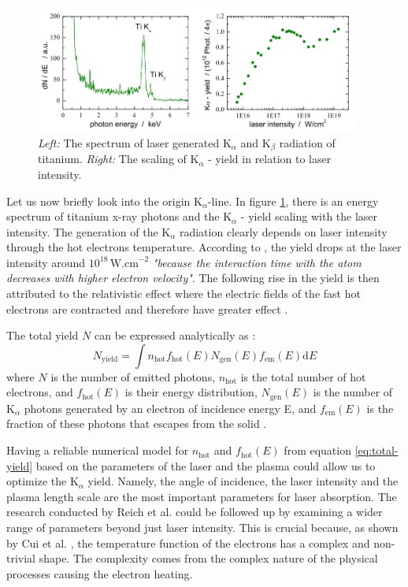 \begin{figure}[h]
	\centering
	\includegraphics[width=0.95\textwidth]{figures/spectrum-ti}
	\caption{\textit{Left:} The spectrum of laser generated $\mathrm{K}_\alpha$ and $\mathrm{K}_\beta$ radiation of titanium. \textit{Right:} The scaling of $\mathrm{K}_\alpha$ - yield in relation to laser intensity. \cite{schwoerer2004}}
	\label{fig:ti-spectrum}
\end{figure}

Let us now briefly look into the origin $\mathrm{K}_\alpha$-line. In figure \ref{fig:ti-spectrum}, there is an energy spectrum of titanium x-ray photons and the $\mathrm{K}_\alpha$ - yield scaling with the laser intensity. The generation of the $\mathrm{K}_\alpha$ radiation clearly depends on laser intensity through the hot electrons temperature. According to \cite{schwoerer2004}, the yield drops at the laser intensity around $10^{18}\,\mathrm{W.cm}^{-2}$ \textit{"because the interaction time with the atom decreases with higher electron velocity"}. The following rise in the yield is then attributed to the relativistic effect where the electric fields of the fast hot electrons are contracted and therefore have greater effect \cite{schwoerer2004}.

The total yield $N$ can be expressed analytically as \cite{reich2000}:
\begin{equation}
	N_{\mathrm{yield}} = \int n_\mathrm{hot} f_\mathrm{hot}(E) N_\mathrm{gen}(E) f_\mathrm{em}(E)\mathrm{d}E
	\label{eq:total-yield}
\end{equation}
where $N$ is the number of emitted photons, $n_\mathrm{hot}$ is the total number of hot electrons, and $f_\mathrm{hot}(E)$ is their energy distribution, $N_\mathrm{gen}(E)$ is the number of $\mathrm{K}_\alpha$ photons generated by an electron of incidence energy E, and $f_\mathrm{em}(E)$ is the fraction of these photons that escapes from the solid \cite{reich2000}. 

Having a reliable numerical model for $n_\mathrm{hot}$ and $f_\mathrm{hot}(E)$ from equation \ref{eq:total-yield} based on the parameters of the laser and the plasma could allow us to optimize the $\mathrm{K}_\alpha$ yield. Namely, the angle of incidence, the laser intensity and the plasma length scale are the most important parameters for laser absorption. The research conducted by Reich et al. \cite{reich2000} could be followed up by examining a wider range of parameters beyond just laser intensity. This is crucial because, as shown by Cui et al. \cite{cui2013}, the temperature function of the electrons has a complex and non-trivial shape. The complexity comes from the complex nature of the physical processes causing the electron heating.

